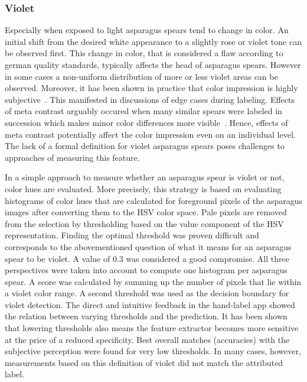 \subsubsection{Violet}
\label{subsec:Violet}

Especially when exposed to light asparagus spears tend to change in color. An initial shift from the desired white appearance to a slightly rose or violet tone can be observed first. This change in color, that is considered a flaw according to german quality standards, typically affects the head of asparagus spears. However in some cases a non-uniform distribution of more or less violet areas can be observed. Moreover, it has been shown in practice that color impression is highly subjective~\citep{luo2000review}. This manifested in discussions of edge cases during labeling. Effects of meta contrast arguably occured when many similar spears were labeled in succession which makes minor color differences more visible~\citep{reeves1981metacontrast}. Hence, effects of meta contrast potentially affect the color impression even on an individual level. The lack of a formal definition for violet asparagus spears poses challenges to approaches of measuring this feature.

\bigskip
In a simple approach to measure whether an asparagus spear is violet or not, color hues are evaluated. More precisely, this strategy is based on evaluating histograms of color hues that are calculated for foreground pixels of the asparagus images after converting them to the HSV color space. Pale pixels are removed from the selection by thresholding based on the value component of the HSV representation. Finding the optimal threshold was proven difficult and corresponds to the abovementioned question of what it means for an asparagus spear to be violet. A value of 0.3 was considered a good compromise. All three perspectives were taken into account to compute one histogram per asparagus spear. A score was calculated by summing up the number of pixels that lie within a violet color range. A second threshold was used as the decision boundary for violet detection. The direct and intuitive feedback in the hand-label app showed the relation between varying thresholds and the prediction. It has been shown that lowering thresholds also means the feature extractor becomes more sensitive at the price of a reduced specificity. Best overall matches (accuracies) with the subjective perception were found for very low thresholds. In many cases, however, measurements based on this definition of violet did not match the attributed label.

